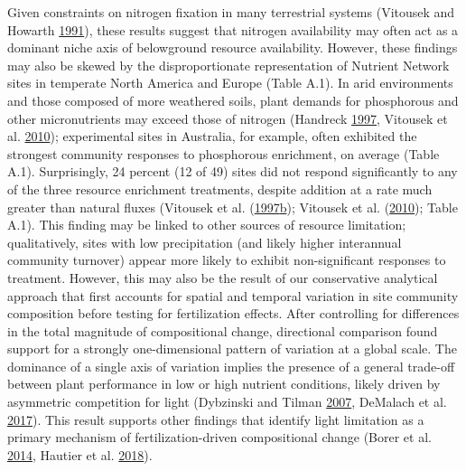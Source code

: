 \documentclass[twoside,12pt,final]{ucthesis-CA2012}
\begin{document}
\begin{ucmainmatter}
Given constraints on nitrogen fixation in many terrestrial systems (Vitousek and Howarth \protect\hyperlink{ref-Vitousek1991}{1991}), these results suggest that nitrogen availability may often act as a dominant niche axis of belowground resource availability. However, these findings may also be skewed by the disproportionate representation of Nutrient Network sites in temperate North America and Europe (Table A.1). In arid environments and those composed of more weathered soils, plant demands for phosphorous and other micronutrients may exceed those of nitrogen (Handreck \protect\hyperlink{ref-Handreck1997}{1997}, Vitousek et al. \protect\hyperlink{ref-Vitousek2010}{2010}); experimental sites in Australia, for example, often exhibited the strongest community responses to phosphorous enrichment, on average (Table A.1).
Surprisingly, 24 percent (12 of 49) sites did not respond significantly to any of the three resource enrichment treatments, despite addition at a rate much greater than natural fluxes (Vitousek et al. (\protect\hyperlink{ref-Vitousek1997}{1997}\protect\hyperlink{ref-Vitousek1997}{b}); Vitousek et al. (\protect\hyperlink{ref-Vitousek2010}{2010}); Table A.1). This finding may be linked to other sources of resource limitation; qualitatively, sites with low precipitation (and likely higher interannual community turnover) appear more likely to exhibit non-significant responses to treatment. However, this may also be the result of our conservative analytical approach that first accounts for spatial and temporal variation in site community composition before testing for fertilization effects.
After controlling for differences in the total magnitude of compositional change, directional comparison found support for a strongly one-dimensional pattern of variation at a global scale. The dominance of a single axis of variation implies the presence of a general trade-off between plant performance in low or high nutrient conditions, likely driven by asymmetric competition for light (Dybzinski and Tilman \protect\hyperlink{ref-Dybzinski2007a}{2007}, DeMalach et al. \protect\hyperlink{ref-DeMalach2017a}{2017}). This result supports other findings that identify light limitation as a primary mechanism of fertilization-driven compositional change (Borer et al. \protect\hyperlink{ref-Borer2014a}{2014}, Hautier et al. \protect\hyperlink{ref-Hautier2018}{2018}).

\end{ucmainmatter}
\end{document}
